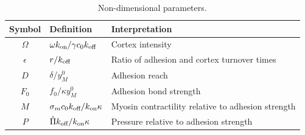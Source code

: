\begin{table}[t!]
\caption{Non-dimensional parameters.}\centering \label{tab:par} 
\begin{tabular}{ c  l  l}
\hline
Symbol & Definition & Interpretation \\
\hline
$ \Omega$ &  ${ \omega  k_{\mbox{\scriptsize on}}} / {\gamma c_0 k_{\mbox{\scriptsize off}}}$ & Cortex intensity\\
 $\epsilon$ &  ${ r} / {k_{\mbox{\scriptsize off}}}$& Ratio of adhesion and cortex turnover times\\
$D$ &  ${ \delta} / {y_M^0}$&Adhesion reach \\
$F_0$ &  ${ f_0} / {\kappa y_M^0}$&Adhesion bond strength\\
$M$ &  ${\sigma_m c_0 k_{\mbox{\scriptsize off}}} / {k_{\mbox{\scriptsize on}} \kappa}$ &Myosin contractility relative to adhesion strength\\
$P$ &  ${\hat{\Pi} k_{\mbox{\scriptsize off}}} / {k_{\mbox{\scriptsize on}} \kappa}$ & Pressure relative to adhesion strength\\
\hline
\end{tabular}
\end{table}


